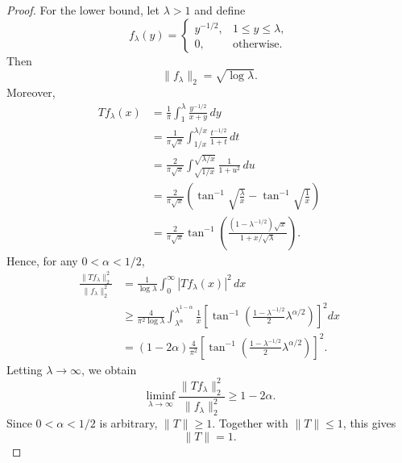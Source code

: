 \documentclass{article}
\begin{document}
\begin{proof}
For the lower bound, let $\lambda>1$ and define
\[
f_\lambda(y)=
\begin{cases}
y^{-1/2}, & 1\le y\le \lambda,\\
0, & \text{otherwise}.
\end{cases}
\]
Then
\[
\|f_\lambda\|_2=\sqrt{\log \lambda}.
\]
Moreover,
\[
\begin{aligned}
Tf_\lambda(x)
&=
\frac1\pi\int_1^\lambda \frac{y^{-1/2}}{x+y}\,dy  \\
&=
\frac{1}{\pi\sqrt{x}}
\int_{1/x}^{\lambda/x}\frac{t^{-1/2}}{1+t}\,dt  \\
&=
\frac{2}{\pi\sqrt{x}}
\int_{\sqrt{1/x}}^{\sqrt{\lambda/x}}
\frac{1}{1+u^2}\,du  \\
&=
\frac{2}{\pi\sqrt{x}}
\left(
\tan^{-1}\sqrt{\frac{\lambda}{x}}
-
\tan^{-1}\sqrt{\frac1x}
\right) \\
&=
\frac{2}{\pi\sqrt{x}}
\tan^{-1}
\left(
\frac{(1-\lambda^{-1/2})\sqrt{x}}{1+x/\sqrt{\lambda}}
\right).
\end{aligned}
\]
Hence, for any $0 < \alpha < 1/2$,
\[
\begin{aligned}
\frac{\|Tf_\lambda\|_2^2}{\|f_\lambda\|_2^2}
&=
\frac1{\log\lambda}
\int_0^\infty |Tf_\lambda(x)|^2\,dx  \\
&\ge
\frac{4}{\pi^2\log\lambda}
\int_{\lambda^\alpha}^{\lambda^{1-\alpha}}
\frac1x
\left[
\tan^{-1}
\left(
\frac{1-\lambda^{-1/2}}{2}\lambda^{\alpha/2}
\right)
\right]^2
dx  \\
&=
(1-2\alpha)\frac{4}{\pi^2}
\left[
\tan^{-1}
\left(
\frac{1-\lambda^{-1/2}}{2}\lambda^{\alpha/2}
\right)
\right]^2 .
\end{aligned}
\]
Letting $\lambda\to\infty$, we obtain
\[
\liminf_{\lambda\to\infty}
\frac{\|Tf_\lambda\|_2^2}{\|f_\lambda\|_2^2}
\ge
1-2\alpha .
\]
Since $0 < \alpha < 1/2$ is arbitrary, $\|T\|\ge 1$.  Together with
$\|T\|\le 1$, this gives
\[
\|T\|=1.
\]
\end{proof}
\end{document}
